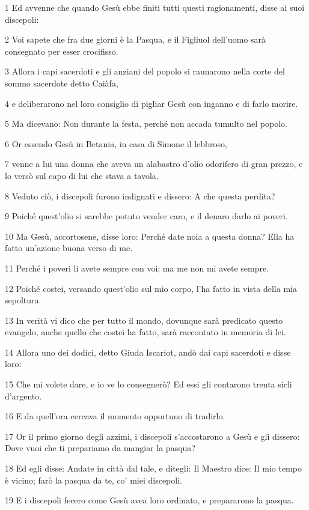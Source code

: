 \par 1 Ed avvenne che quando Gesù ebbe finiti tutti questi ragionamenti, disse ai suoi discepoli:
\par 2 Voi sapete che fra due giorni è la Pasqua, e il Figliuol dell'uomo sarà consegnato per esser crocifisso.
\par 3 Allora i capi sacerdoti e gli anziani del popolo si raunarono nella corte del sommo sacerdote detto Caiàfa,
\par 4 e deliberarono nel loro consiglio di pigliar Gesù con inganno e di farlo morire.
\par 5 Ma dicevano: Non durante la festa, perché non accada tumulto nel popolo.
\par 6 Or essendo Gesù in Betania, in casa di Simone il lebbroso,
\par 7 venne a lui una donna che aveva un alabastro d'olio odorifero di gran prezzo, e lo versò sul capo di lui che stava a tavola.
\par 8 Veduto ciò, i discepoli furono indignati e dissero: A che questa perdita?
\par 9 Poiché quest'olio si sarebbe potuto vender caro, e il denaro darlo ai poveri.
\par 10 Ma Gesù, accortosene, disse loro: Perché date noia a questa donna? Ella ha fatto un'azione buona verso di me.
\par 11 Perché i poveri li avete sempre con voi; ma me non mi avete sempre.
\par 12 Poiché costei, versando quest'olio sul mio corpo, l'ha fatto in vista della mia sepoltura.
\par 13 In verità vi dico che per tutto il mondo, dovunque sarà predicato questo evangelo, anche quello che costei ha fatto, sarà raccontato in memoria di lei.
\par 14 Allora uno dei dodici, detto Giuda Iscariot, andò dai capi sacerdoti e disse loro:
\par 15 Che mi volete dare, e io ve lo consegnerò? Ed essi gli contarono trenta sicli d'argento.
\par 16 E da quell'ora cercava il momento opportuno di tradirlo.
\par 17 Or il primo giorno degli azzimi, i discepoli s'accostarono a Gesù e gli dissero: Dove vuoi che ti prepariamo da mangiar la pasqua?
\par 18 Ed egli disse: Andate in città dal tale, e ditegli: Il Maestro dice: Il mio tempo è vicino; farò la pasqua da te, co' miei discepoli.
\par 19 E i discepoli fecero come Gesù avea loro ordinato, e prepararono la pasqua.
